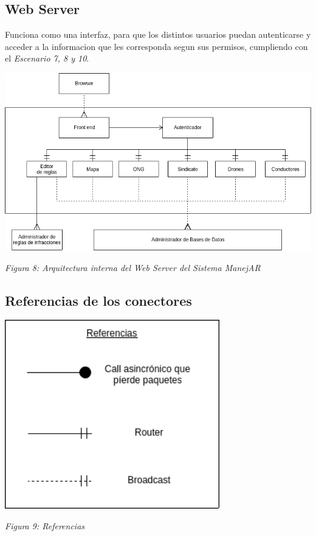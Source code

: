 \newpage

\subsection{Web Server}

Funciona como una interfaz, para que los distintos usuarios puedan autenticarse 
y acceder a la informacion que les corresponda segun sus permisos, cumpliendo 
con el \textit{Escenario 7, 8 y 10}.


\begin{center}
  \includegraphics[width=1\textwidth]{./imagenes/arquitectura_tp2/web_server.png}
  \centerline{\textit{Figura 8: Arquitectura interna del Web Server del Sistema ManejAR}}
\end{center}

\newpage

\subsection{Referencias de los conectores}

\begin{center}
  \includegraphics[width=0.7\textwidth]{./imagenes/arquitectura_tp2/referencias.png}
  \centerline{\textit{Figura 9: Referencias}}
\end{center}